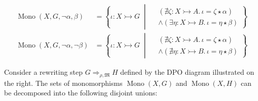 \begin{notation}
\begin{align*}
        \\
        \operatorname{Mono}(X,G,\lnot \alpha, \beta) &= \left\{ 
            \iota \colon X \rightarrowtail G \;\middle|\; 
                \begin{aligned}  
                    &(\nexists \zeta \colon X \rightarrowtail A.\, \iota = \zeta \star \alpha) \\ 
                    &\land (\exists \eta \colon X \rightarrowtail B.\, \iota = \eta \star \beta)
                \end{aligned}
        \right\}
        \\
        \operatorname{Mono}(X,G,\lnot \alpha, \lnot \beta) &= \left\{ 
            \iota \colon X \rightarrowtail G \;\middle|\; 
                \begin{aligned}
                    &(\nexists \zeta \colon X \rightarrowtail A.\, \iota = \zeta \star \alpha) \\
                    &\land (\nexists \eta \colon X \rightarrowtail B.\, \iota = \eta \star \beta)
                \end{aligned}
        \right\}
    \end{align*}
\end{notation}
\noindent
\begin{minipage}{0.7\textwidth}\setlength{\parindent}{1em}
\noindent Consider a rewriting step \( G \Rightarrow_{\rho,\mathfrak{M}} H \) defined by the DPO diagram illustrated on the right. The sets of monomorphisms \( \operatorname{Mono}(X,G) \) and \( \operatorname{Mono}(X,H) \) can be decomposed into the following disjoint unions:
\end{minipage}%
\begin{minipage}{0.29\textwidth}
    \hfill
\end{minipage}


